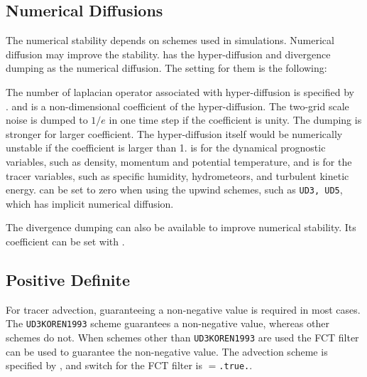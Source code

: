 \subsection{Numerical Diffusions}

The numerical stability depends on schemes used in simulations.
Numerical diffusion may improve the stability.
\scalerm has the hyper-diffusion and divergence dumping as the numerical diffusion.
The setting for them is the following:


The number of laplacian operator associated with hyper-diffusion is specified by \\
. 
 and  is a non-dimensional coefficient of the hyper-diffusion.
The two-grid scale noise is dumped to $1/e$ in one time step if the coefficient is unity.
The dumping is stronger for larger coefficient.
The hyper-diffusion itself would be numerically unstable if the coefficient is larger than 1.
 is for the dynamical prognostic variables, such as density, momentum and potential temperature, and  is for the tracer variables, such as specific humidity, hydrometeors, and turbulent kinetic energy.
 can be set to zero when using the upwind schemes, such as \verb|UD3, UD5|, which has implicit numerical diffusion.


The divergence dumping can also be available to improve numerical stability.
Its coefficient can be set with .


\subsection{Positive Definite}

For tracer advection, guaranteeing a non-negative value is required in most cases.\\
The \verb|UD3KOREN1993| scheme guarantees a non-negative value, whereas other schemes do not.
When schemes other than \verb|UD3KOREN1993| are used the FCT filter can be used to guarantee the non-negative value.
The advection scheme is specified by , and switch for the FCT filter is $=$\verb|.true.|.


